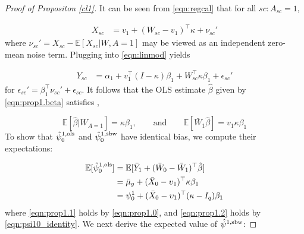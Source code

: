 \begin{proof}[Proof of Propositon \ref{cl1}]
It can be seen from \eqref{eqn:regcal} that for all $sc: A_{sc}=1$,

\begin{align*}
   X_{sc} &= v_1 + (W_{sc} - v_1)^\top \kappa + \nu_{sc}'
\end{align*}
where $\nu_{sc}' = X_{sc} - \mathbb{E}[X_{sc}|W,A=1]$ may be viewed as an independent zero-mean noise term. Plugging into \eqref{eqn:linmod} yields 

\begin{align*}
   Y_{sc} & = \alpha_1 + v_1^\top (I - \kappa)\beta_1 + W_{sc}^\top \kappa \beta_1 + \epsilon_{sc}'
\end{align*}
for $\epsilon_{sc}' = \beta_1^\top \nu_{sc}' + \epsilon_{sc}$. It follows that the OLS estimate $\hat{\beta}$ given by \eqref{eqn:prop1.beta} satisfies \citep{gleser1992importance},

\begin{equation}\label{eqn:prop1.0}
\mathbb{E}[\hat{\beta}|W_{A=1}] = \kappa \beta_1, \qquad \text{and} \qquad \mathbb{E}[\bar{W}_1 \hat{\beta}] = v_1 \kappa \beta_1
\end{equation}
To show that $\hat{\psi}_0^{1,\textup{ols}}$ and $\hat{\psi}_0^{1, \textup{sbw}}$ have identical bias, we compute their expectations:

\begin{align}
\nonumber	\mathbb{E}[\hat{\psi}_0^{1,\textup{ols}}] &= \mathbb{E}[ \bar{Y}_1 + (\bar{W}_0 - \bar{W}_1)^\top \hat{\beta}] \\
	& = \bar{\mu}_y + (\bar{X}_0 - \upsilon_1)^\top\kappa\beta_1 \label{eqn:prop1.1}\\
	& = \psi_0^1 + (\bar{X}_0 - \upsilon_1)^\top(\kappa - I_q)\beta_1 \label{eqn:prop1.2}
\end{align}
where \eqref{eqn:prop1.1} holds by \eqref{eqn:prop1.0}, and \eqref{eqn:prop1.2} holds by \eqref{eqn:psi10_identity}. We next derive the expected value of $\hat{\psi}^{1, \textup{sbw}}$:


\end{proof}
